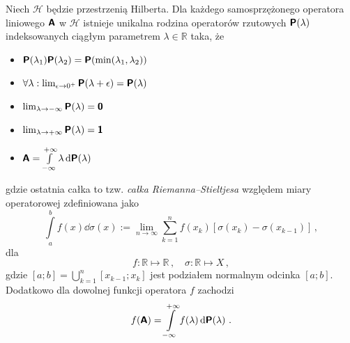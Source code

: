 \documentclass{myclass}
\begin{document}
\linesep

\begin{theorem}
Niech \(\mathscr{H}\) będzie przestrzenią Hilberta. Dla każdego samosprzężonego operatora liniowego
\(\boldsymbol{\mathsf{A}}\) w \(\mathscr{H}\) istnieje unikalna rodzina operatorów rzutowych \(\boldsymbol{\mathsf{P}}(\lambda)\)
indeksowanych ciągłym parametrem \(\lambda \in \mathbb{R}\) taka, że
\begin{itemize}
    
    \item \(\boldsymbol{\mathsf{P}}(\lambda_1)\boldsymbol{\mathsf{P}}(\lambda_2) = \boldsymbol{\mathsf{P}}(\min(\lambda_1,\lambda_2))\)

    \item \(\forall \lambda: \lim_{\epsilon\to0^+}\boldsymbol{\mathsf{P}}(\lambda+\epsilon) = \boldsymbol{\mathsf{P}}(\lambda)\)
    
    \item \(\lim_{\lambda\to-\infty}\boldsymbol{\mathsf{P}}(\lambda) = \boldsymbol{\mathsf{0}}\)

    \item \(\lim_{\lambda\to+\infty}\boldsymbol{\mathsf{P}}(\lambda) = \boldsymbol{\mathsf{1}}\)

    \item \(\boldsymbol{\mathsf{A}} = \int\limits_{-\infty}^{+\infty}\lambda \dd{\boldsymbol{\mathsf{P}}(\lambda)}\)

\end{itemize}
gdzie ostatnia całka to tzw. \textit{całka Riemanna--Stieltjesa} względem miary operatorowej
zdefiniowana jako
\begin{equation*}
        \int\limits_a^b f(x) \dd{\sigma(x)} := \lim_{n\to\infty}\sum_{k=1}^nf(x_k)\left[\sigma(x_k) - \sigma(x_{k-1})\right]\,,
\end{equation*}
dla 
\begin{equation*}
    f: \mathbb{R} \mapsto \mathbb{R}\,,\quad \sigma: \mathbb{R} \mapsto X\,,
\end{equation*}
gdzie \([a;b] = \bigcup_{k=1}^{n}[x_{k-1}; x_k]\) jest podziałem normalnym odcinka \([a;b]\).
Dodatkowo dla dowolnej funkcji operatora \(f\) zachodzi
\begin{equation*}
    f(\boldsymbol{\mathsf{A}}) = \int\limits_{-\infty}^{+\infty} f(\lambda) \dd{\boldsymbol{\mathsf{P}}(\lambda)}\,.
\end{equation*}
\end{theorem}        
\end{document}
